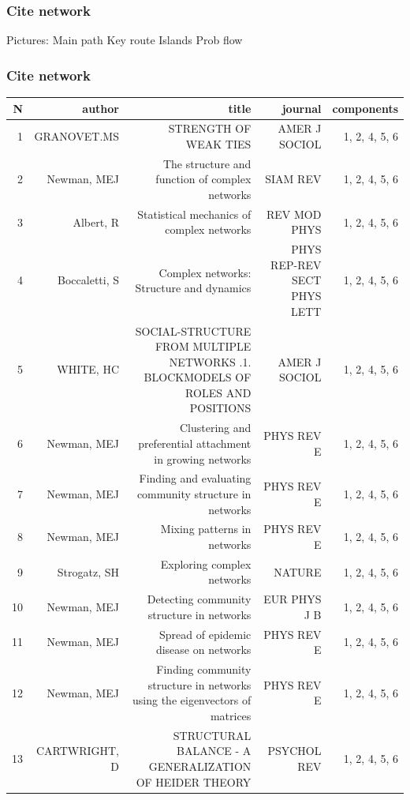 \documentclass[hyperref={pdfstartview={FitBH -32768},
                         pdfpagemode=FullScreen,
                         plainpages=false,
                         colorlinks=true}
              ]{beamer}
\begin{document}
\begin{frame}[fragile]
\frametitle{Cite network}
\small

Pictures: 
Main path 
Key route 
Islands
Prob flow 

\end{frame}

\begin{frame}[fragile]
\frametitle{Cite network}
\small

\renewcommand{\arraystretch}{0.5}
\tiny
\begin{tabular}{r|r|r|r|r|}
N&   	author&   	title&   	journal&   	components \\ \hline 
1&   	GRANOVET.MS&   	 STRENGTH OF WEAK TIES&   	AMER J SOCIOL&   	1, 2, 4, 5, 6\\
2&   	Newman, MEJ&   	 The structure and function of complex networks&   	SIAM REV&   	1, 2, 4, 5, 6\\
3&   	Albert, R&   	 Statistical mechanics of complex networks&   	REV MOD PHYS&   	1, 2, 4, 5, 6\\
4&   	Boccaletti, S&   	 Complex networks: Structure and dynamics&   	PHYS REP-REV SECT PHYS LETT&   	1, 2, 4, 5, 6\\
5&   	WHITE, HC&   	 SOCIAL-STRUCTURE FROM MULTIPLE NETWORKS .1. BLOCKMODELS OF ROLES AND POSITIONS&   	AMER J SOCIOL&   	1, 2, 4, 5, 6\\
6&   	Newman, MEJ&   	 Clustering and preferential attachment in growing networks&   	PHYS REV E&   	1, 2, 4, 5, 6\\
7&   	Newman, MEJ&   	 Finding and evaluating community structure in networks&   	PHYS REV E&   	1, 2, 4, 5, 6\\
8&   	Newman, MEJ&   	 Mixing patterns in networks&   	PHYS REV E&   	1, 2, 4, 5, 6\\
9&   	Strogatz, SH&   	 Exploring complex networks&   	NATURE&   	1, 2, 4, 5, 6\\
10&   	Newman, MEJ&   	 Detecting community structure in networks&   	EUR PHYS J B&   	1, 2, 4, 5, 6\\
11&   	Newman, MEJ&   	 Spread of epidemic disease on networks&   	PHYS REV E&   	1, 2, 4, 5, 6\\
12&   	Newman, MEJ&   	 Finding community structure in networks using the eigenvectors of matrices&   	PHYS REV E&   	1, 2, 4, 5, 6\\
13&   	CARTWRIGHT, D&   	 STRUCTURAL BALANCE - A GENERALIZATION OF HEIDER THEORY&   	PSYCHOL REV&   	1, 2, 4, 5, 6\\

\end{tabular}
\end{frame}
\end{document}
